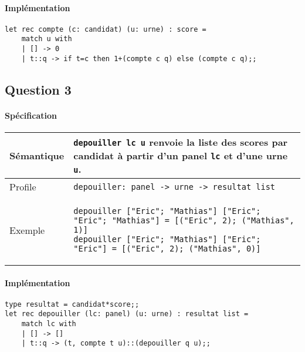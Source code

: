 \documentclass[french, 10pt, a4paper]{article}
\begin{document}
\paragraph{Implémentation}

\begin{verbatim}
let rec compte (c: candidat) (u: urne) : score =
	match u with
	| [] -> 0
	| t::q -> if t=c then 1+(compte c q) else (compte c q);;
\end{verbatim}



\subsection{Question 3}

\paragraph{Spécification}

\begin{center}
	\begin{tabular}{|p{2cm}|p{\dimexpr\linewidth-2cm-4\tabcolsep-3\arrayrulewidth}|}
		\hline
		Sémantique
		&
		\texttt{depouiller lc u} renvoie la liste des scores par candidat à partir d'un panel \texttt{lc} et d'une urne \texttt{u}. %
%
		\\
		\hline
		Profile
		&
		\texttt{depouiller: panel -> urne -> resultat list}
%
		\\
		\hline
		Exemple
		&
		\begin{verbatim}
depouiller ["Eric"; "Mathias"] ["Eric"; "Eric"; "Mathias"] = [("Eric", 2); ("Mathias", 1)]
depouiller ["Eric"; "Mathias"] ["Eric"; "Eric"] = [("Eric", 2); ("Mathias", 0)]
		\end{verbatim}
%
		\\
		\hline
	\end{tabular}
\end{center}

\paragraph{Implémentation}

\begin{verbatim}
type resultat = candidat*score;;
let rec depouiller (lc: panel) (u: urne) : resultat list =
	match lc with
	| [] -> []
	| t::q -> (t, compte t u)::(depouiller q u);;
\end{verbatim}
\end{document}
